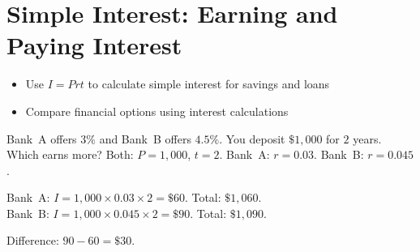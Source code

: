 \section{Simple Interest: Earning and Paying Interest}

\begin{stepGoal}
\begin{itemize}
    \item Use $I = Prt$ to calculate simple interest for savings and loans
    \item Compare financial options using interest calculations
\end{itemize}
\end{stepGoal}

\begin{stepVocabBox}
\end{stepVocabBox}

\begin{stepsCard}
\end{stepsCard}

\begin{stepExample}{Bank~A offers $3\%$ and Bank~B offers $4.5\%$. You deposit $\$1{,}000$ for $2$ years. Which earns more?}
     Both: $P = 1{,}000$, $t = 2$. Bank~A: $r = 0.03$. Bank~B: $r = 0.045$.

     Bank~A: $I = 1{,}000 \times 0.03 \times 2 = \$60$. Total: $\$1{,}060$.\\
    Bank~B: $I = 1{,}000 \times 0.045 \times 2 = \$90$. Total: $\$1{,}090$.

     Difference: $90 - 60 = \$30$.
\end{stepExample}

